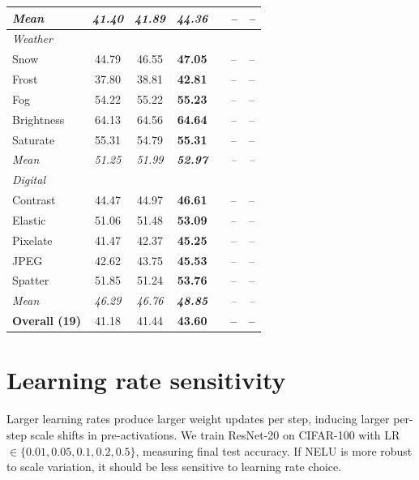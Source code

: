 \begin{table}[t]
\begin{tabular}{l ccc c cc}
\rowcolor{gray!8}
\quad \textit{Mean}  & \textit{41.40} & \textit{41.89} & \textit{\textbf{44.36}} & & \textit{--} & \textit{--} \\
\midrule
\multicolumn{7}{l}{\textit{Weather}} \\
\quad Snow           & 44.79 & 46.55 & \textbf{47.05} & & -- & -- \\
\quad Frost          & 37.80 & 38.81 & \textbf{42.81} & & -- & -- \\
\quad Fog            & 54.22 & 55.22 & \textbf{55.23} & & -- & -- \\
\quad Brightness     & 64.13 & 64.56 & \textbf{64.64} & & -- & -- \\
\quad Saturate       & 55.31 & 54.79 & \textbf{55.31} & & -- & -- \\
\rowcolor{gray!8}
\quad \textit{Mean}  & \textit{51.25} & \textit{51.99} & \textit{\textbf{52.97}} & & \textit{--} & \textit{--} \\
\midrule
\multicolumn{7}{l}{\textit{Digital}} \\
\quad Contrast       & 44.47 & 44.97 & \textbf{46.61} & & -- & -- \\
\quad Elastic        & 51.06 & 51.48 & \textbf{53.09} & & -- & -- \\
\quad Pixelate       & 41.47 & 42.37 & \textbf{45.25} & & -- & -- \\
\quad JPEG           & 42.62 & 43.75 & \textbf{45.53} & & -- & -- \\
\quad Spatter        & 51.85 & 51.24 & \textbf{53.76} & & -- & -- \\
\rowcolor{gray!8}
\quad \textit{Mean}  & \textit{46.29} & \textit{46.76} & \textit{\textbf{48.85}} & & \textit{--} & \textit{--} \\
\midrule
\textbf{Overall (19)} & 41.18 & 41.44 & \textbf{43.60} & & \textbf{--} & \textbf{--} \\
\bottomrule
\end{tabular}
\end{table}


\section{Learning rate sensitivity}\label{app:lr}

Larger learning rates produce larger weight updates per step, inducing larger per-step scale shifts in pre-activations.
We train ResNet-20 on CIFAR-100 with LR $\in \{0.01, 0.05, 0.1, 0.2, 0.5\}$, measuring final test accuracy.
If NELU is more robust to scale variation, it should be less sensitive to learning rate choice.

